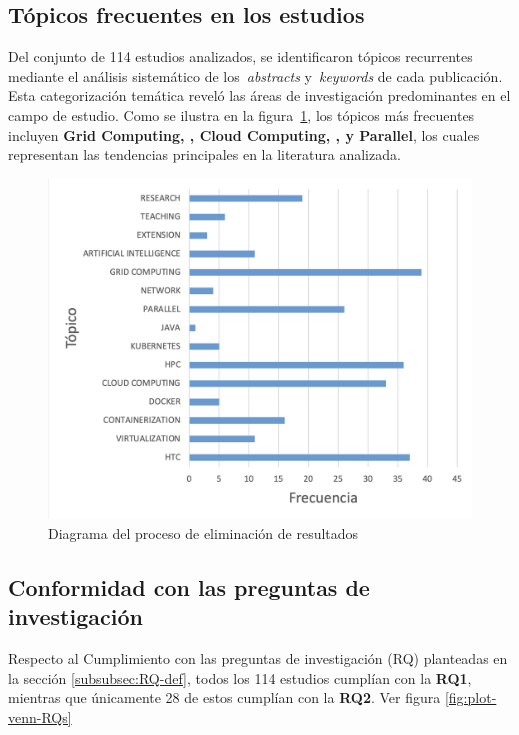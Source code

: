 \subsection{Tópicos frecuentes en los estudios}
\noindent

Del conjunto de 114 estudios analizados, se identificaron tópicos recurrentes mediante el análisis sistemático de los~\textit{abstracts} y~\textit{keywords} de cada publicación. Esta categorización temática reveló las áreas de investigación predominantes en el campo de estudio. Como se ilustra en la figura~\ref{fig:plot-topicos}, los tópicos más frecuentes incluyen \textbf{Grid Computing, \HPC, Cloud Computing, \HTC, y Parallel}, los cuales representan las tendencias principales en la literatura analizada.

\begin{figure}[H]
	\centering
	\includegraphics[scale=0.9] {tablas-images/sms/plot-topicos.png}
	\caption{Diagrama del proceso de eliminación de resultados}\label{fig:plot-topicos}
\end{figure}


\subsection{Conformidad con las preguntas de investigación}
Respecto al Cumplimiento con las preguntas de investigación (RQ) planteadas en la sección \ref{subsubsec:RQ-def}, todos los 114 estudios cumplían con la \textbf{RQ1}, mientras que únicamente 28 de estos cumplían con la \textbf{RQ2}. Ver figura \ref{fig:plot-venn-RQs}

